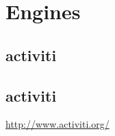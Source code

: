 \documentclass[paper=a4,twoside=false,BCOR=0mm,DIV=calc,fontsize=12pt]{scrartcl}
\begin{document}
\section{Engines}

\subsection{activiti}


\subsection{activiti}






\begin{thebibliography}{99}

 \url{http://www.activiti.org/}




\end{thebibliography}
\end{document}
